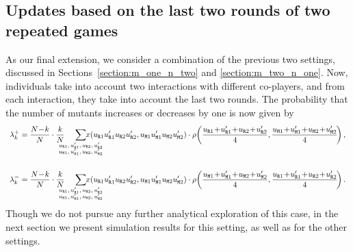 \documentclass[11pt]{article}
\def\resident{\texttt{R}}
\def\mutant{\texttt{M}}
\theoremstyle{plainCl1}
\theoremstyle{plainCl2}
\begin{document}

\subsection{Updates based on the last two rounds of two repeated games}\label{section:m_two_n_two}

As our final extension, we consider a combination of the previous two settings, discussed in Sections~\ref{section:m_one_n_two} and \ref{section:m_two_n_one}. 
Now, individuals take into account two interactions with different co-players, and from each interaction, they take into account the last two rounds. 
The probability that the number of mutants increases or decreases by one is now given by
\begin{equation}\label{eq:ratio_TwoRounds}
\begin{array}{l}
\displaystyle \lambda^+_k=\frac{N\!-\!k}{N}\cdot \frac{k}{N} 
\hspace{-0.5cm}
\sum_
{\scriptsize \begin{array}{l}
u_{\resident 1},u_{\resident 1}', u_{\resident 2},u_{\resident 2}'\\
u_{\mutant 1},u_{\mutant 1}', u_{\mutant 2},u_{\mutant 2}'
\end{array}} 
\hspace{-1cm} x(u_{\resident 1} u_{\resident 1}'u_{\resident 2} u_{\resident 2}' ,u_{\mutant 1}u_{\mutant 1}'u_{\mutant 2}u_{\mutant 2}')\cdot 
\rho\!\left(\frac{u_{\resident 1}\!+\! u_{\resident 1}'\!+\!u_{\resident 2}\!+\!u_{\resident 2}' }{4},
\frac{u_{\mutant 1}\!+\!u_{\mutant 1}'\!+\!u_{\mutant 2}\!+\!u_{\mutant 2}'}{4}\!\right), \\[1.4cm]

\displaystyle \lambda^-_k=\frac{N\!-\!k}{N}\cdot \frac{k}{N} 
\hspace{-0.5cm}
\sum_
{\scriptsize \begin{array}{l}
u_{\resident 1},u_{\resident 1}', u_{\resident 2},u_{\resident 2}'\\
u_{\mutant 1},u_{\mutant 1}', u_{\mutant 2},u_{\mutant 2}'
\end{array}} 
\hspace{-1cm} x(u_{\resident 1} u_{\resident 1}'u_{\resident 2} u_{\resident 2}' ,u_{\mutant 1}u_{\mutant 1}'u_{\mutant 2}u_{\mutant 2}')\cdot 
\rho\!\left(\frac{u_{\mutant 1}\!+\!u_{\mutant 1}'\!+\!u_{\mutant 2}\!+\!u_{\mutant 2}'}{4},
\frac{u_{\resident 1}\!+\! u_{\resident 1}'\!+\!u_{\resident 2}\!+\!u_{\resident 2}' }{4}\!\right).
\end{array}
\end{equation}
 Though we do not pursue any further analytical exploration of this case, in the
next section we present simulation results for this setting, as well as for the other settings.\\
\end{document}
